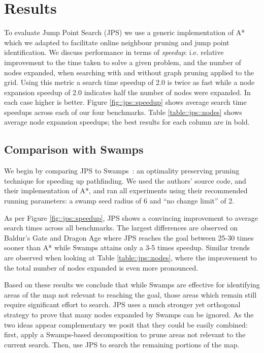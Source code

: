 \section{Results}
\label{cha::jps::results}

To evaluate Jump Point Search (JPS) we use a generic implementation of A*
which we adapted to facilitate online neighbour pruning and jump point
identification.  We discuss performance in terms of \emph{speedup}: i.e.
relative improvement to the time taken to solve a given problem, and the
number of nodes expanded, when searching with and without graph pruning
applied to the grid.  Using this metric a search time speedup of 2.0 is twice
as fast while a node expansion speedup of 2.0 indicates half the number of
nodes were expanded.  In each case higher is better.  Figure
\ref{fig::jps::speedup} shows average search time speedups across each of our
four benchmarks. Table \ref{table::jps::nodes} shows average node expansion
speedups; the best results for each column are in bold.



\subsection{Comparison with Swamps}
We begin by comparing JPS to Swamps~\cite{pochter10}: an optimality preserving
pruning technique for speeding up pathfinding.  We used the authors' source
code, and their implementation of A*, and ran all experiments using their
recommended running parameters: a swamp seed radius of 6 and ``no change
limit'' of 2.

As per Figure \ref{fig::jps::speedup}, JPS shows a convincing improvement to
average search times across all benchmarks.  The largest differences are
observed on Baldur's Gate and Dragon Age where JPS reaches the goal between
25-30 times sooner than A* while Swamps attains only a 3-5 times speedup.
Similar trends are observed when looking at Table \ref{table::jps::nodes},
where the improvement to the total number of nodes expanded is even more
pronounced.

Based on these results we conclude that while Swamps are effective for
identifying areas of the map not relevant to reaching the goal, those areas
which remain still require significant effort to search.  JPS uses a much
stronger yet orthogonal strategy to prove that many nodes expanded by Swamps
can be ignored.  As the two ideas appear complementary we posit that they
could be easily combined: first, apply a Swamps-based decomposition to prune
areas not relevant to the current search.  Then, use JPS to search the
remaining portions of the map.

